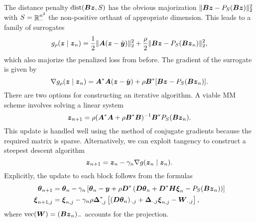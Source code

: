\documentclass{article}
\begin{document}
The distance penalty \(\mathop{\rm dist}\nolimits(\boldsymbol{B} \boldsymbol{z}, S)\) has the obvious majorization \(\|\boldsymbol{B} \boldsymbol{z} - P_{S}(\boldsymbol{B} \boldsymbol{z})\|^{2}_{2}\) with \(S = \mathop{\mathbb{R}}\nolimits^{n^{2}}_{-}\) the non-positive orthant of appropriate dimension.
This leads to a family of surrogates
\begin{equation*}
    g_{\rho}(\boldsymbol{z} \mid \boldsymbol{z}_{n})
    =
    \frac{1}{2} \|\boldsymbol{A} (\boldsymbol{z} - \tilde{\boldsymbol{y}})\|_{2}^{2}
    +
    \frac{\rho}{2} \|\boldsymbol{B} \boldsymbol{z} - P_{S}(\boldsymbol{B} \boldsymbol{z}_{n})\|^{2}_{2},
\end{equation*}
which also majorize the penalized loss from before.
The gradient of the surrogate is given by
\begin{equation*}
    \nabla g_{\rho}(\boldsymbol{z} \mid \boldsymbol{z}_{n})
    =
    \boldsymbol{A}^{\ast} \boldsymbol{A} (\boldsymbol{z} - \tilde{\boldsymbol{y}})
    +
    \rho \boldsymbol{B}^{\ast}[\boldsymbol{B} \boldsymbol{z} - P_{S}(\boldsymbol{B} \boldsymbol{z}_{n})].
\end{equation*}
There are two options for constructing an iterative algorithm.
A viable MM scheme involves solving a linear system
\begin{equation*}
    \boldsymbol{z}_{n+1}
    =
    \rho (\boldsymbol{A}^{\ast} \boldsymbol{A} + \rho \boldsymbol{B}^{\ast} \boldsymbol{B})^{-1}
    \boldsymbol{B}^{\ast} P_{S}(\boldsymbol{B} \boldsymbol{z}_{n}).
\end{equation*}
This update is handled well using the method of conjugate gradients because the required matrix is sparse.
Alternatively, we can exploit tangency to construct a steepest descent algorithm
\begin{equation*}
    \boldsymbol{z}_{n+1}
    =
    \boldsymbol{z}_{n} - \gamma_{n} \nabla g(\boldsymbol{z}_{n} \mid \boldsymbol{z}_{n}).
\end{equation*}
Explicitly, the update to each block follows from the formulas
\begin{align*}
    \boldsymbol{\theta}_{n+1}
    &=
    \boldsymbol{\theta}_{n} - \gamma_{n}\left[
        \boldsymbol{\theta}_{n} - \boldsymbol{y}
        + \rho \boldsymbol{D}^{\ast} \left(\boldsymbol{D} \boldsymbol{\theta}_{n}
        + \boldsymbol{D}^{\ast} \boldsymbol{H} \boldsymbol{\xi}_{n} - P_{S}(\boldsymbol{B} \boldsymbol{z}_{n})
        \right)
    \right] \\
    \boldsymbol{\xi}_{n+1,j}
    &=
    \boldsymbol{\xi}_{n,j} - \gamma_{n} \rho \boldsymbol{\Delta}_{\cdot,j}^{\ast}\left[
        (\boldsymbol{D} \boldsymbol{\theta}_{n})_{\cdot,j}
        + \boldsymbol{\Delta}_{\cdot,j} \boldsymbol{\xi}_{n,j}
        - \boldsymbol{W}_{\cdot,j}
    \right],
\end{align*}
where \(\mathop{\rm vec}\nolimits(\boldsymbol{W}) = (\boldsymbol{B} \boldsymbol{z}_{n})_{-}\) accounts for the projection.
\end{document}
